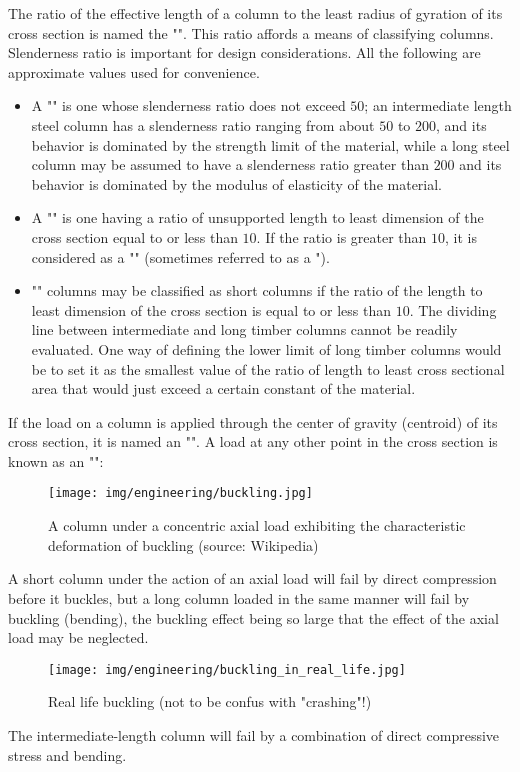 	The ratio of the effective length of a column to the least radius of gyration of its cross section is named the "". This ratio affords a means of classifying columns. Slenderness ratio is important for design considerations. All the following are approximate values used for convenience.
	\begin{itemize}
		\item A "" is one whose slenderness ratio does not exceed $50$; an intermediate length steel column has a slenderness ratio ranging from about $50$ to $200$, and its behavior is dominated by the strength limit of the material, while a long steel column may be assumed to have a slenderness ratio greater than $200$ and its behavior is dominated by the modulus of elasticity of the material.
	
		\item A "" is one having a ratio of unsupported length to least dimension of the cross section equal to or less than $10$. If the ratio is greater than $10$, it is considered as a "" (sometimes referred to as a ").
	
		\item "" columns may be classified as short columns if the ratio of the length to least dimension of the cross section is equal to or less than $10$. The dividing line between intermediate and long timber columns cannot be readily evaluated. One way of defining the lower limit of long timber columns would be to set it as the smallest value of the ratio of length to least cross sectional area that would just exceed a certain constant of the material.
	\end{itemize}
	If the load on a column is applied through the center of gravity (centroid) of its cross section, it is named an "". A load at any other point in the cross section is known as an "":
	\begin{figure}[H]
		\centering
		\texttt{[image: img/engineering/buckling.jpg]}
		\caption{A column under a concentric axial load exhibiting the characteristic deformation of buckling (source: Wikipedia)}
	\end{figure}
	A short column under the action of an axial load will fail by direct compression before it buckles, but a long column loaded in the same manner will fail by buckling (bending), the buckling effect being so large that the effect of the axial load may be neglected.
	\begin{figure}[H]
		\centering
		\texttt{[image: img/engineering/buckling\_in\_real\_life.jpg]}
		\caption{Real life buckling (not to be confus with "crashing"!)}
	\end{figure}
	 The intermediate-length column will fail by a combination of direct compressive stress and bending.

